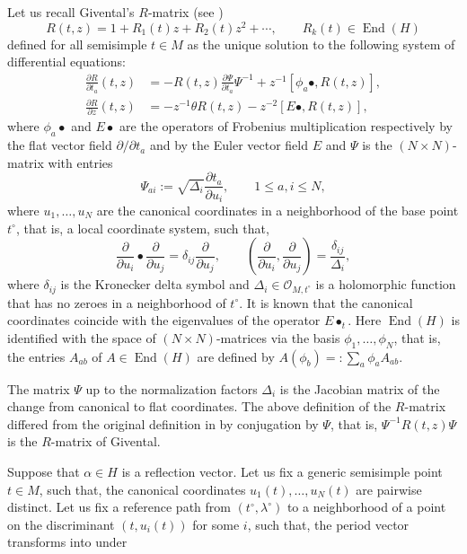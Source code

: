\documentclass[10pt,a4paper]{article}
\numberwithin{equation}{section}
\renewcommand{\O}{\mathcal{O}}
\begin{document}
Let us recall Givental's $R$-matrix (see \cite{Givental:qqh})
\[
R(t,z)=1+R_1(t) z+R_2(t) z^2+\cdots,\qquad
R_k(t)\in \operatorname{End}(H)
\]
defined for all semisimple $t\in M$ as the unique solution to the
following system of differential equations:
\begin{align*}
\frac{\partial R}{\partial t_a} (t,z) & = -
R(t,z) \frac{\partial \Psi}{\partial t_a} \Psi^{-1} +
 z^{-1}[\phi_a\bullet,R(t,z)],\\
\frac{\partial R}{\partial z} (t,z) & = -
z^{-1}\theta R(t,z) -
z^{-2} [E\bullet, R(t,z)],
\end{align*}
where $\phi_a\bullet$ and $E\bullet$ are the operators of Frobenius
multiplication respectively by the flat vector field
$\partial/\partial t_a$ and by the Euler vector field $E$ and $\Psi$ is
the $(N\times N)$-matrix with entries
\[
\Psi_{ai}:= \sqrt{\Delta_i} \frac{\partial t_a}{\partial u_i},
\qquad
1\leq a,i\leq N,
\]
where $u_1,\dots,u_N$ are the canonical coordinates in a neighborhood
of the base point $t^\circ$, that is, a local coordinate system, such that,
\[
\frac{\partial}{\partial u_i} \bullet \frac{\partial}{\partial u_j} =
\delta_{ij} \frac{\partial}{\partial u_j},\qquad
\left( \frac{\partial}{\partial u_i},\frac{\partial}{\partial
 u_j}\right)=
\frac{\delta_{ij}}{\Delta_{i}},
\]
where $\delta_{ij} $ is the Kronecker delta symbol and $\Delta_i\in
\O_{M,t^\circ}$ is a holomorphic function that has no zeroes in a
neighborhood of $t^\circ$. It is known that the canonical coordinates
coincide with the eigenvalues of the operator $E\bullet_t$.
Here $\operatorname{End}(H)$ is identified with the space of $(N\times
N)$-matrices via the basis $\phi_1,\dots,\phi_N$, that is, the
entries $A_{ab}$ of $A\in \operatorname{End}(H)$ are defined by
$A(\phi_b)=:\sum_a \phi_a A_{ab}$.
\begin{Remark}
The matrix $\Psi$ up to the normalization factors $\Delta_i$ is the
Jacobian matrix of the change from canonical to flat coordinates. The
above definition of the $R$-matrix differed from the original
definition in \cite{Givental:qqh} by conjugation by $\Psi$, that is,
$\Psi^{-1}R(t,z)\Psi$ is the $R$-matrix of Givental.
\end{Remark}
Suppose that $\alpha \in H$ is a reflection vector. Let us fix a generic
semisimple point $t\in M$, such that, the canonical coordinates
$u_1(t),\dots,u_N(t)$
are pairwise distinct. Let us fix a reference path from
$(t^\circ,\lambda^\circ)$ to a neighborhood of a point on the
discriminant $(t,u_i(t))$ for some $i$, such that, the period vector
 transforms into  under
\end{document}
